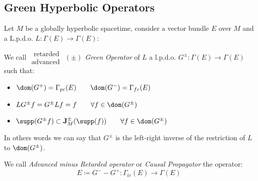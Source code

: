 \documentclass[Main]{subfiles}
\begin{document}
		\subsection{Green Hyperbolic Operators}	
			Let $M$ be a globally hyperbolic spacetime, consider a vector bundle $E$ over $M$ and a L.p.d.o. $L: \Gamma(E) \rightarrow \Gamma(E)$:
			\begin{definition}\label{Def:GreenOperators}
				We call \emph{$\substack{\textrm{ retarded}\\ \textrm{advanced } } (\pm)$ Green Operator} of $L$ a 
				l.p.d.o. $G^\pm : \Gamma (E) \rightarrow \Gamma(E)$ such that:
				\begin{itemize}
					\item $\dom(G^+) = \Gamma_{pc}(E) \qquad \dom(G^-) = \Gamma_{fc}(E)$
					\item $LG^\pm f=G^\pm Lf = f \qquad \forall f\in \dom(G^\pm)$
					\item $\supp(G^\pm f) \subset \mathbf{J}^\pm_M (\supp(f)) \qquad \forall f\in \dom(G^\pm)$
				\end{itemize}
			\end{definition}
				In others words we can say that 
				$G^\pm$ is the left-right inverse of the restriction of $L$ to $\dom(G^\pm)$.
			\begin{notationfix}
			
				We call \emph{Advanced minus Retarded operator} or \emph{Causal Propagator}\cite{Benini2013} the operator:
				\begin{displaymath}
					E \coloneqq G^-  - G^+ : \Gamma_{tc}(E) \rightarrow \Gamma(E)
				\end{displaymath}
			\end{notationfix}		
		
\end{document}
